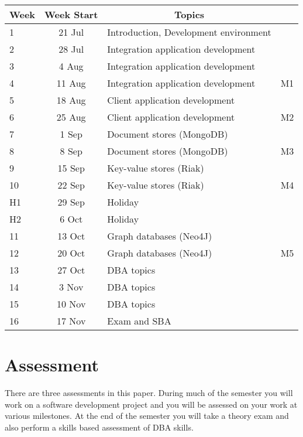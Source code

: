 \documentclass{article}
\begin{document}
\renewcommand{\arraystretch}{1.5}
\begin{tabular}{|l|c|l|l|}
\hline
 Week & Week Start & \multicolumn{1}{c|}{Topics}               &   \\ \hline
 1    & 21 Jul     & Introduction, Development environment     &   \\ \hline
 2    & 28 Jul     & Integration application development       &   \\ \hline
 3    &  4 Aug     & Integration application development       &   \\ \hline
 4    & 11 Aug     & Integration application development       & M1  \\ \hline
 5    & 18 Aug     & Client application development            &   \\ \hline
 6    & 25 Aug     & Client application development            & M2  \\ \hline
 7    &  1 Sep     & Document stores (MongoDB)                 &   \\ \hline
 8    &  8 Sep     & Document stores (MongoDB)                 & M3  \\ \hline
 9    & 15 Sep     & Key-value stores (Riak)                   &   \\ \hline
 10   & 22 Sep     & Key-value stores (Riak)                   & M4  \\ \hline
 H1   & 29 Sep     & Holiday                                   &   \\ \hline
 H2   &  6 Oct     & Holiday                                   &   \\ \hline
 11   & 13 Oct     & Graph databases (Neo4J)                   &   \\ \hline
 12   & 20 Oct     & Graph databases (Neo4J)                   & M5  \\ \hline
 13   & 27 Oct     & DBA topics                                &   \\ \hline
 14   &  3 Nov     & DBA topics                                &   \\ \hline
 15   & 10 Nov     & DBA topics                                &   \\ \hline
 16   & 17 Nov     & Exam and SBA                              &   \\ \hline
\end{tabular}

\section*{Assessment}
There are three assessments in this paper.  During much of the semester you will work on a software development project and you will be assessed on your work at various milestones.
At the end of the semester you will take a theory exam and also perform a skills based assessment of DBA skills.
\vspace{1\baselineskip}
\end{document}
